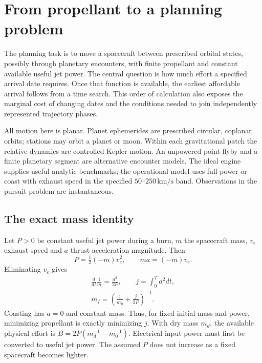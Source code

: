\section{From propellant to a planning problem}
\label{sec:model}
The planning task is to move a spacecraft between prescribed orbital
states, possibly through planetary encounters, with finite propellant and
constant available useful jet power. The central question is how much
effort a specified arrival date requires. Once that function is available,
the earliest affordable arrival follows from a time search. This order
of calculation also exposes the marginal cost of changing dates and the
conditions needed to join independently represented trajectory phases.

All motion here is planar. Planet ephemerides are prescribed circular,
coplanar orbits; stations may orbit a planet or moon. Within each
gravitational patch the relative dynamics are controlled Kepler motion.
An unpowered point flyby and a finite planetary segment are alternative
encounter models. The ideal engine supplies useful analytic benchmarks;
the operational model uses full power or coast with exhaust speed in
the specified $50$--$250\,\mathrm{km/s}$ band. Observations in the
pursuit problem are instantaneous.

\subsection{The exact mass identity}
Let $P>0$ be constant useful jet power during a burn, $m$ the spacecraft
mass, $v_e$ exhaust speed and $a$ thrust acceleration magnitude. Then
\begin{equation}
 P=\tfrac12(-\dot m)v_e^2,\qquad ma=(-\dot m)v_e.
\end{equation}
Eliminating $v_e$ gives
\begin{equation}
 \begin{gathered}
 \frac{d}{dt}\frac1m=\frac{a^2}{2P},\qquad j=\int_0^T a^2dt,\\
 m_f=\left(\frac1{m_0}+\frac{j}{2P}\right)^{-1}.
 \end{gathered}
 \label{eq:mass}
\end{equation}
Coasting has $a=0$ and constant mass. Thus, for fixed initial mass and
power, minimizing propellant is exactly minimizing $j$. With dry mass
$m_d$, the available physical effort is
$B=2P(m_d^{-1}-m_0^{-1})$.
Electrical input power must first be converted to useful jet power.
The assumed $P$ does not increase as a fixed spacecraft becomes lighter.

